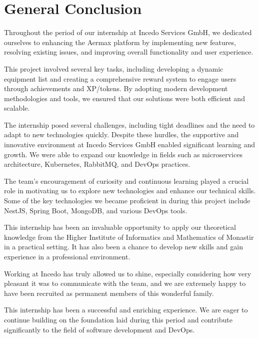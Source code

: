 \thispagestyle{plain} %
\section*{General Conclusion}

Throughout the period of our internship at Incedo Services GmbH, we dedicated ourselves to enhancing the Aermax platform by implementing new features, resolving existing issues, and improving overall functionality and user experience.

This project involved several key tasks, including developing a dynamic equipment list and creating a comprehensive reward system to engage users through achievements and XP/tokens. By adopting modern development methodologies and tools, we ensured that our solutions were both efficient and scalable.

The internship posed several challenges, including tight deadlines and the need to adapt to new technologies quickly. Despite these hurdles, the supportive and innovative environment at Incedo Services GmbH enabled significant learning and growth. We were able to expand our knowledge in fields such as microservices architecture, Kubernetes, RabbitMQ, and DevOps practices.

The team's encouragement of curiosity and continuous learning played a crucial role in motivating us to explore new technologies and enhance our technical skills. Some of the key technologies we became proficient in during this project include NestJS, Spring Boot, MongoDB, and various DevOps tools.

This internship has been an invaluable opportunity to apply our theoretical knowledge from the Higher Institute of Informatics and Mathematics of Monastir in a practical setting. It has also been a chance to develop new skills and gain experience in a professional environment. 

Working at Incedo has truly allowed us to shine, especially considering how very pleasant it was to communicate with the team, and we are extremely happy to have been recruited as permanent members of this wonderful family.

This internship has been a successful and enriching experience. We are eager to continue building on the foundation laid during this period and contribute significantly to the field of software development and DevOps.





